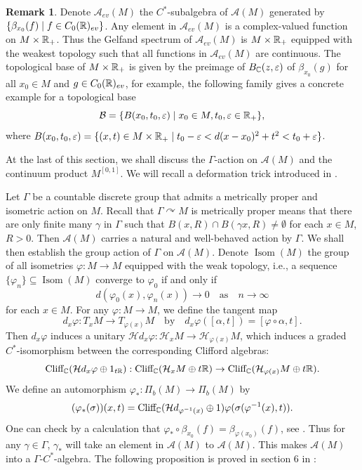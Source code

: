 \documentclass[11pt]{article}
\theoremstyle{definition}
\newtheorem{Rem}[Def]{Remark}
\theoremstyle{plain}
\def\A{\mathcal A}\def\C{\mathcal C}\def\B{\mathcal B}\def\E{\mathcal E}\def\O{\mathcal O}\def\h{\mathfrak h}\def\K{\mathcal K}\def\F{\mathcal F}\def\P{\mathcal P}\def\L{\mathcal L}\def\R{\mathcal R}\def\Q{\mathcal Q}\def\H{\mathcal H}\def\S{\mathcal S}\def\N{\mathcal N}\def\U{\mathcal U}\def\V{\mathcal V}
\def\Cl{\textup{Cliff}_{\IC}}
\def\Ga{\Gamma}
\def\car{\curvearrowright}
\begin{document}
\begin{Rem}
Denote $\A_{ev}(M)$ the $C^*$-subalgebra of $\A(M)$ generated by $\{\beta_{x_0}(f)\mid f\in C_0(\mathbb R)_{ev}\}$. Any element in $\A_{ev}(M)$ is a complex-valued function on $M\times\mathbb R_+$. Thus the Gelfand spectrum of $\A_{ev}(M)$ is $M\times\mathbb R_+$ equipped with the weakest topology such that all functions in $\A_{ev}(M)$ are continuous. The topological base of $M\times\mathbb R_+$ is given by the preimage of $B_{\mathbb C}(z,\varepsilon)$ of $\beta_{x_0}(g)$ for all $x_0\in M$ and $g\in C_0(\mathbb R)_{ev}$, for example, the following family gives a concrete example for a topological base
$$\B=\{B(x_0,t_0,\varepsilon)\mid x_0\in M, t_0,\varepsilon\in\IR_+\},$$
where $B(x_0,t_0,\varepsilon)=\{(x,t)\in M\times\mathbb R_+\mid t_0-\varepsilon<d(x-x_0)^2+t^2<t_0+\varepsilon\}$.
\end{Rem}

At the last of this section, we shall discuss the $\Ga$-action on $\A(M)$ and the continuum product $M^{[0,1]}$. We will recall a deformation trick introduced in \cite[Proposition 3.18]{GWY2018}.

Let $\Ga$ be a countable discrete group that admits a metrically proper and isometric action on $M$. Recall that $\Ga\car M$ is metrically proper means that there are only finite many $\gamma$ in $\Ga$ such that $B(x, R)\cap B(\gamma x, R)\ne\emptyset$ for each $x\in M$, $R>0$. Then $\A(M)$ carries a natural and well-behaved action by $\Ga$. We shall then establish the group action of $\Ga$ on $\A(M)$. Denote $\operatorname{Isom}(M)$ the group of all isometries $\varphi:M\to M$ equipped with the weak topology, i.e., a sequence $\{\varphi_n\}\subseteq \operatorname{Isom}(M)$ converge to $\varphi_0$ if and only if
$$d(\varphi_0(x),\varphi_n(x))\to0\quad\text{as}\quad n\to\infty$$
for each $x\in M$. For any $\varphi:M\to M$, we define the tangent map
$$d_x\varphi:T_xM\to T_{\varphi(x)}M\quad\text{by}\quad d_x\varphi([\alpha,t])=[\varphi\circ\alpha,t].$$
Then $d_x\varphi$ induces a unitary $\H d_x\varphi:\H_xM\to\H_{\varphi(x)}M$, which induces a graded $C^*$-isomorphism between the corresponding Clifford algebras:
$$\Cl(\H d_x\varphi\oplus 1_{t\IR}):\Cl(\H_xM\oplus t\IR)\to\Cl(\H_{\varphi(x)}M\oplus t\IR).$$
We define an automorphism $\varphi_*:\Pi_b(M)\to\Pi_b(M)$ by
$$(\varphi_*(\sigma))(x,t)=\Cl(\H d_{\varphi^{-1}(x)}\oplus 1)\varphi(\sigma(\varphi^{-1}(x),t)).$$
One can check by a calculation that $\varphi_*\circ\beta_{x_0}(f)=\beta_{\varphi(x_0)}(f)$, see \cite[Lemma 6.2]{GWY2018}. Thus for any $\gamma\in\Ga$, $\gamma_*$ will take an element in $\A(M)$ to $\A(M)$. This makes $\A(M)$ into a $\Ga$-$C^*$-algebra. The following proposition is proved in section 6 in \cite{GWY2018}:
\end{document}
